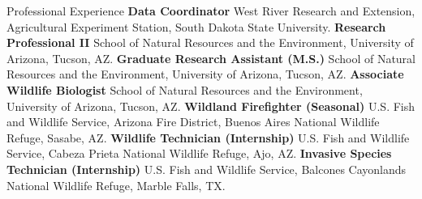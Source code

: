\begin{rubric}{Professional Experience}
\entry*[7/2024 -- Present]%
    \textbf{Data Coordinator} West River Research and Extension, Agricultural Experiment Station, South Dakota State University.
%
\entry*[8/2018 -- 7/2024]%
	\textbf{Research Professional II} School of Natural Resources and the Environment, University of Arizona, Tucson, AZ.
%
\entry*[7/2016 -- 5/2018]%
	\textbf{Graduate Research Assistant (M.S.)} School of Natural Resources and the Environment, University of Arizona, Tucson, AZ.
%
\entry*[3/2016 -- 7/2016]%
    \textbf{Associate Wildlife Biologist} School of Natural Resources and the Environment, University of Arizona, Tucson, AZ.
%
\entry*[4/2015 -- 10/2015]%
    \textbf{Wildland Firefighter (Seasonal)} U.S. Fish and Wildlife Service, Arizona Fire District, Buenos Aires National Wildlife Refuge, Sasabe, AZ.
%
\entry*[9/2013 -- 5/2015]
    \textbf{Wildlife Technician (Internship)} U.S. Fish and Wildlife Service, Cabeza Prieta National Wildlife Refuge, Ajo, AZ.
%
\entry*[5/2013 -- 9/2013]
    \textbf{Invasive Species Technician (Internship)} U.S. Fish and Wildlife Service, Balcones Cayonlands National Wildlife Refuge, Marble Falls, TX.
\end{rubric}